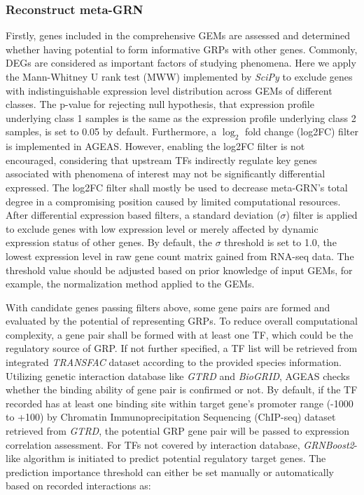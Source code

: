 \documentclass[fleqn,10pt]{wlscirep}
\begin{document}
    \subsubsection*{Reconstruct meta-GRN}
      Firstly, genes included in the comprehensive GEMs are assessed and determined whether having potential to form informative GRPs with other genes.
      Commonly, DEGs are considered as important factors of studying phenomena.
      Here we apply the Mann-Whitney U rank test (MWW) implemented by \emph{SciPy}\cite{2020SciPy-NMeth} to exclude genes with indistinguishable expression level distribution across GEMs of different classes.
      The p-value for rejecting null hypothesis, that expression profile underlying class 1 samples is the same as the expression profile underlying class 2 samples, is set to 0.05 by default.
      Furthermore, a $\log_2$ fold change (log2FC) filter is implemented in AGEAS.
      However, enabling the log2FC filter is not encouraged, considering that upstream TFs indirectly regulate key genes associated with phenomena of interest may not be significantly differential expressed.
      The log2FC filter shall mostly be used to decrease meta-GRN's total degree in a compromising position caused by limited computational resources.
      After differential expression based filters, a standard deviation ($\sigma$) filter is applied to exclude genes with low expression level or merely affected by dynamic expression status of other genes.
      By default, the $\sigma$ threshold is set to 1.0, the lowest expression level in raw gene count matrix gained from RNA-seq data.
      The threshold value should be adjusted based on prior knowledge of input GEMs, for example, the normalization method applied to the GEMs.

      With candidate genes passing filters above, some gene pairs are formed and evaluated by the potential of representing GRPs.
      To reduce overall computational complexity, a gene pair shall be formed with at least one TF, which could be the regulatory source of GRP.
      If not further specified, a TF list will be retrieved from integrated \emph{TRANSFAC}\cite{transfac} dataset according to the provided species information.
      Utilizing genetic interaction database like \emph{GTRD}\cite{gkaa1057} and \emph{BioGRID}\cite{biogrid}, AGEAS checks whether the binding ability of gene pair is confirmed or not.
      By default, if the TF recorded has at least one binding site within target gene's promoter range (-1000 to +100) by Chromatin Immunoprecipitation Sequencing (ChIP-seq) dataset retrieved from \emph{GTRD}\cite{gkaa1057}, the potential GRP gene pair will be passed to expression correlation assessment.
      For TFs not covered by interaction database, \emph{GRNBoost2}\cite{grnboost2}-like algorithm is initiated to predict potential regulatory target genes.
      The prediction importance threshold can either be set manually or automatically based on recorded interactions as:
\end{document}

